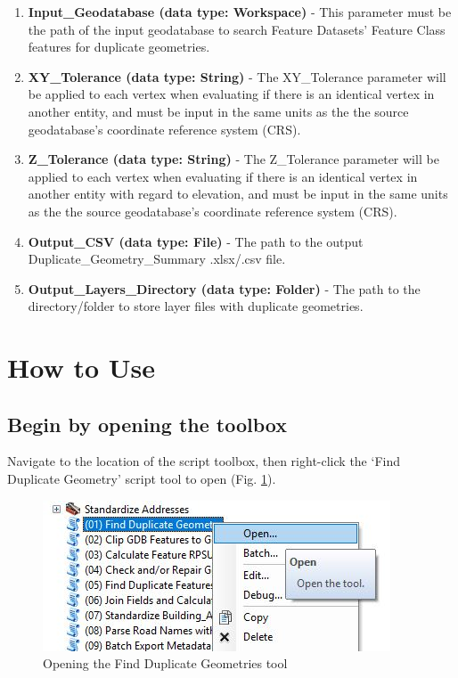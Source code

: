 \documentclass[openany]{book}
\providecommand{\tightlist}{%
  \setlength{\itemsep}{0pt}\setlength{\parskip}{0pt}}
\theoremstyle{definition}
\theoremstyle{definition}
\theoremstyle{definition}
\theoremstyle{remark}
\begin{document}
\begin{enumerate}
\def\labelenumi{\arabic{enumi}.}
\tightlist
\item
  \textbf{Input\_Geodatabase (data type: Workspace)} - This parameter
  must be the path of the input geodatabase to search Feature Datasets'
  Feature Class features for duplicate geometries.\\
\item
  \textbf{XY\_Tolerance (data type: String)} - The XY\_Tolerance
  parameter will be applied to each vertex when evaluating if there is
  an identical vertex in another entity, and must be input in the same
  units as the the source geodatabase's coordinate reference system
  (CRS).
\item
  \textbf{Z\_Tolerance (data type: String)} - The Z\_Tolerance parameter
  will be applied to each vertex when evaluating if there is an
  identical vertex in another entity with regard to elevation, and must
  be input in the same units as the the source geodatabase's coordinate
  reference system (CRS).
\item
  \textbf{Output\_CSV (data type: File)} - The path to the output
  Duplicate\_Geometry\_Summary .xlsx/.csv file.
\item
  \textbf{Output\_Layers\_Directory (data type: Folder)} - The path to
  the directory/folder to store layer files with duplicate geometries.
\end{enumerate}

\section{How to Use}\label{how-to-use-3}

\subsection{Begin by opening the
toolbox}\label{begin-by-opening-the-toolbox-3}

Navigate to the location of the script toolbox, then right-click the
`Find Duplicate Geometry' script tool to open (Fig. \ref{fig:dupGopen}).

\begin{figure}[H]

{\centering \includegraphics{figures/dupG-opentool} 

}

\caption{Opening the Find Duplicate Geometries tool}\label{fig:dupGopen}
\end{figure}
\end{document}
